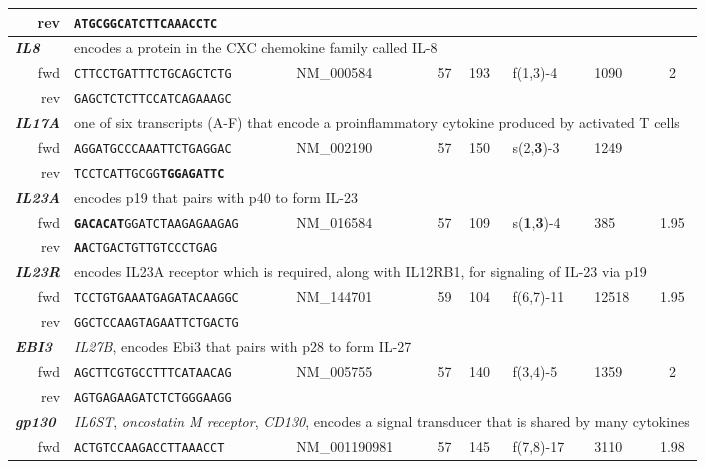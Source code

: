 \documentclass[12pt,a4paper]{scrreprt} %
\begin{document}
\begin{table}
{\begin{tabular}{rllclllc}
\ rev & \texttt{ATGCGGCATCTTCAAAC\textbf{CTC}} & & &  &  &  &  \\ 
\hline \multicolumn{1}{l}{\textit{\textbf{IL8}}} & \multicolumn{7}{l}{encodes a protein in the CXC chemokine family called IL-8} \\ 
\ fwd & \texttt{CTTCCTGATTTCTGCAGCTCTG} & NM\_000584 & 57 & 193 & f(1,3)-4 & 1090 & 2 \\ 
\ rev & \texttt{GAGCTCTCTTCCATCAGAAAGC} &  &  &  &  &  &  \\ 
\hline \multicolumn{1}{l}{\textit{\textbf{IL17A}}} & \multicolumn{7}{l}{one of six transcripts (A-F) that encode a proinflammatory cytokine produced by activated T cells} \\ 
\ fwd & \texttt{AGGATGCCCAAATTCTGAGGAC} & NM\_002190 & 57 & 150 & s(2,\textbf{3})-3 & 1249 &  \\ 
\ rev & \texttt{TCCTCATTGCGG\textbf{TGGAGATTC}} &  &  &  &  &  &  \\ 
\hline \multicolumn{1}{l}{\textit{\textbf{IL23A}}} & \multicolumn{7}{l}{encodes p19    that pairs with p40 to form IL-23} \\ 
\ fwd & \texttt{\textbf{GACACAT}GGATCTAAGAGAAGAG} & NM\_016584 & 57 & 109  & s(\textbf{1},\textbf{3})-4 & 385 & 1.95 \\ 
\ rev & \texttt{\textbf{AA}CTGACTGTTGTCCCTGAG} &  &  &  &  &  &  \\ 
\hline \multicolumn{1}{l}{\textit{\textbf{IL23R}}} & \multicolumn{7}{l}{encodes IL23A receptor which is required, along with IL12RB1, for signaling of IL-23 via p19} \\ 
\ fwd & \texttt{TCCTGTGAAATGAGATACAAGGC} & NM\_144701 & 59 & 104 & f(6,7)-11 & 12518 & 1.95 \\ 
\ rev & \texttt{GGCTCCAAGTAGAATTCTGACTG} &  &  &  &  &  &  \\ 
\hline \multicolumn{1}{l}{\textit{\textbf{EBI3}}} & \multicolumn{7}{l}{\textit{IL27B}, encodes Ebi3 that pairs with p28 to form IL-27} \\ 
\ fwd & \texttt{AGCTTCGTGCCTTTCATAACAG} & NM\_005755 & 57 & 140 & f(3,4)-5 & 1359 & 2 \\ 
\ rev & \texttt{AGTGAGAAGATCTCTGGGAAGG} &  &  &  &  &  &  \\ 
\hline \multicolumn{1}{l}{\textit{\textbf{gp130}}} & \multicolumn{7}{l}{\textit{IL6ST}, \textit{oncostatin M receptor}, \textit{CD130}, encodes a signal transducer that is shared by many cytokines} \\ 
\ fwd & \texttt{ACTGTCCAAGACCTTAAACCT} & NM\_001190981 & 57 & 145 & f(7,8)-17 & 3110 & 1.98 \\ 

\end{tabular}}
\end{table}
\end{document}
